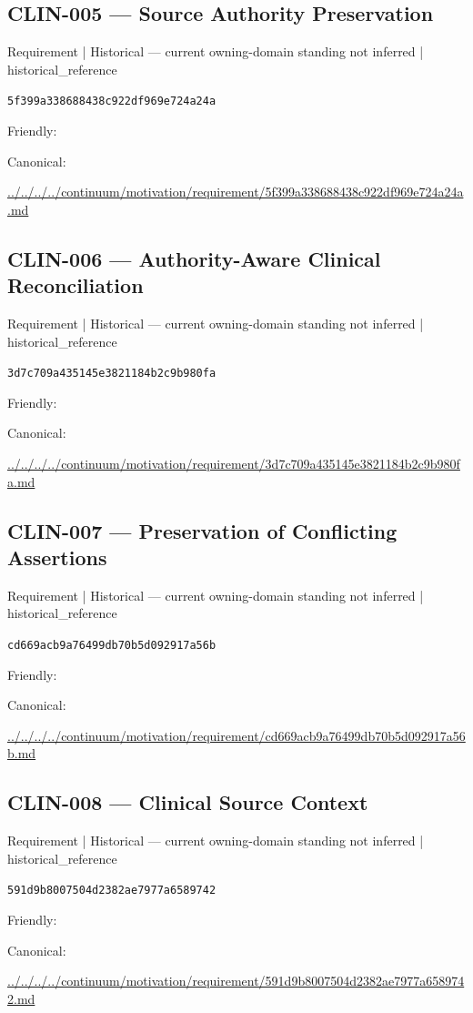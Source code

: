 \documentclass[10pt,a4paper]{article}
\begin{document}
\subsection*{CLIN-005 — Source Authority Preservation}
{\small Requirement | Historical — current owning-domain standing not inferred | historical\_reference}\par
\texttt{5f399a338688438c922df969e724a24a}\par
Friendly: \par
Canonical: \par
{\footnotesize\url{../../../../continuum/motivation/requirement/5f399a338688438c922df969e724a24a.md}}\par
\subsection*{CLIN-006 — Authority-Aware Clinical Reconciliation}
{\small Requirement | Historical — current owning-domain standing not inferred | historical\_reference}\par
\texttt{3d7c709a435145e3821184b2c9b980fa}\par
Friendly: \par
Canonical: \par
{\footnotesize\url{../../../../continuum/motivation/requirement/3d7c709a435145e3821184b2c9b980fa.md}}\par
\subsection*{CLIN-007 — Preservation of Conflicting Assertions}
{\small Requirement | Historical — current owning-domain standing not inferred | historical\_reference}\par
\texttt{cd669acb9a76499db70b5d092917a56b}\par
Friendly: \par
Canonical: \par
{\footnotesize\url{../../../../continuum/motivation/requirement/cd669acb9a76499db70b5d092917a56b.md}}\par
\subsection*{CLIN-008 — Clinical Source Context}
{\small Requirement | Historical — current owning-domain standing not inferred | historical\_reference}\par
\texttt{591d9b8007504d2382ae7977a6589742}\par
Friendly: \par
Canonical: \par
{\footnotesize\url{../../../../continuum/motivation/requirement/591d9b8007504d2382ae7977a6589742.md}}\par
\end{document}
